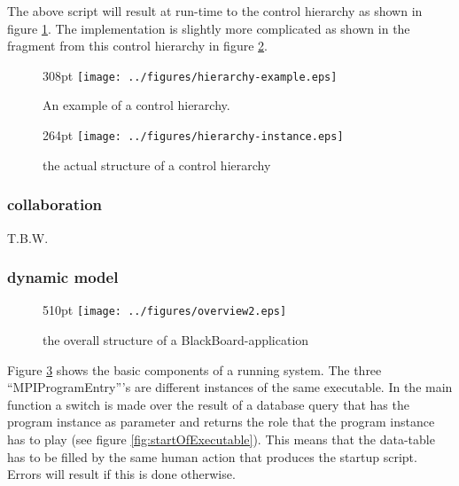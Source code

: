 \documentclass[]{lofar}
\begin{document}
        The above script will result at run-time to the control
        hierarchy as shown in figure
        \hyperlink{fig:hierarchy-example}{\ref{fig:hierarchy-example}}. The
        implementation is slightly more complicated as shown in the
        fragment from this control hierarchy in figure
        \hyperlink{fig:hierarchy-instance}{\ref{fig:hierarchy-instance}}.

        \begin{figure}{308pt}
          \texttt{[image: ../figures/hierarchy-example.eps]}
          \hypertarget{fig:hierarchy-example}{}
          \caption{An example of a control hierarchy.\label{fig:hierarchy-example}}
        \end{figure}

        \begin{figure}{264pt}
          \texttt{[image: ../figures/hierarchy-instance.eps]}
                \hypertarget{fig:hierarchy-instance}{}
          \caption{the actual structure of a control hierarchy\label{fig:hierarchy-instance}}
        \end{figure}

      \subsubsection{collaboration}
        T.B.W.

      \subsubsection{dynamic model}

        \begin{figure}{510pt}
          \texttt{[image: ../figures/overview2.eps]}
          \hypertarget{fig:overview2}{}
          \caption{the overall structure of a BlackBoard-application\label{fig:overview2}}
        \end{figure}

        Figure \hyperlink{fig:overview2}{\ref{fig:overview2}} shows
        the basic components of a running system. The three
        ``MPIProgramEntry'''s are different instances of the same
        executable. In the main function a switch is made over the
        result of a database query that has the program instance as
        parameter and returns the role that the program instance has
        to play (see figure
        \hyperlink{fig:startOfExecutable}{\ref{fig:startOfExecutable}}). This
        means that the data-table has to be filled by the same human
        action that produces the startup script. Errors will result if
        this is done otherwise.
\end{document}
